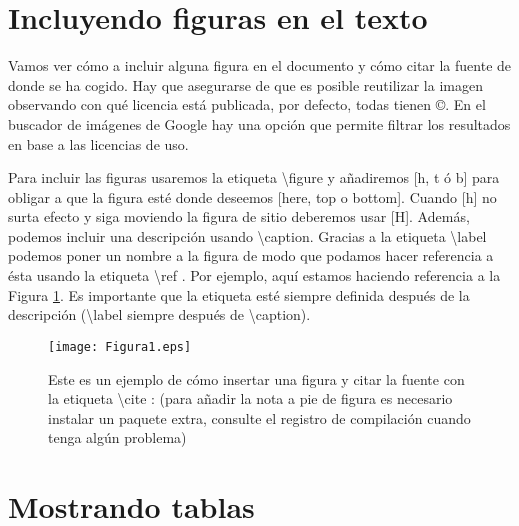 \section{Incluyendo figuras en el texto}


Vamos ver cómo a incluir alguna figura en el documento y cómo citar la fuente de donde se ha cogido. Hay que asegurarse de que es posible reutilizar la imagen observando con qué licencia está publicada, por defecto, todas tienen \copyright . En el buscador de imágenes de Google hay una opción que permite filtrar los resultados en base a las licencias de uso.

Para incluir las figuras usaremos la etiqueta \textbackslash figure y añadiremos [h, t ó b] para obligar a que la figura esté donde deseemos [here, top o bottom]. Cuando [h] no surta efecto y siga moviendo la figura de sitio deberemos usar [H]. Además, podemos incluir una descripción usando \textbackslash caption. Gracias a la etiqueta \textbackslash label podemos poner un nombre a la figura de modo que podamos hacer referencia a ésta usando la etiqueta \textbackslash ref . Por ejemplo, aquí estamos haciendo referencia a la Figura \ref{fig:figura1}. Es importante que la etiqueta esté siempre definida después de la descripción (\textbackslash label siempre después de  \textbackslash caption). 

\begin{figure}[H] %
	\centering
	\texttt{[image: Figura1.eps]}  %
	\caption{Este es un ejemplo de cómo insertar una figura y citar la fuente con la etiqueta \textbackslash cite :  \cite{figura1} (para añadir la nota a pie de figura es necesario instalar un paquete extra, consulte el registro de compilación cuando tenga algún problema)} \label{fig:figura1}
\end{figure}



\section{Mostrando tablas}

